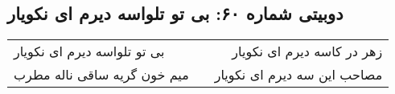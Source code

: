 \begin{center}
\section*{دوبیتی شماره ۶۰: بی تو تلواسه دیرم ای نکویار}
\label{sec:060}
\begin{longtable}{l p{0.5cm} r}
بی تو تلواسه دیرم ای نکویار
&&
زهر در کاسه دیرم ای نکویار
\\
میم خون گریه ساقی ناله مطرب
&&
مصاحب این سه دیرم ای نکویار
\\
\end{longtable}
\end{center}
